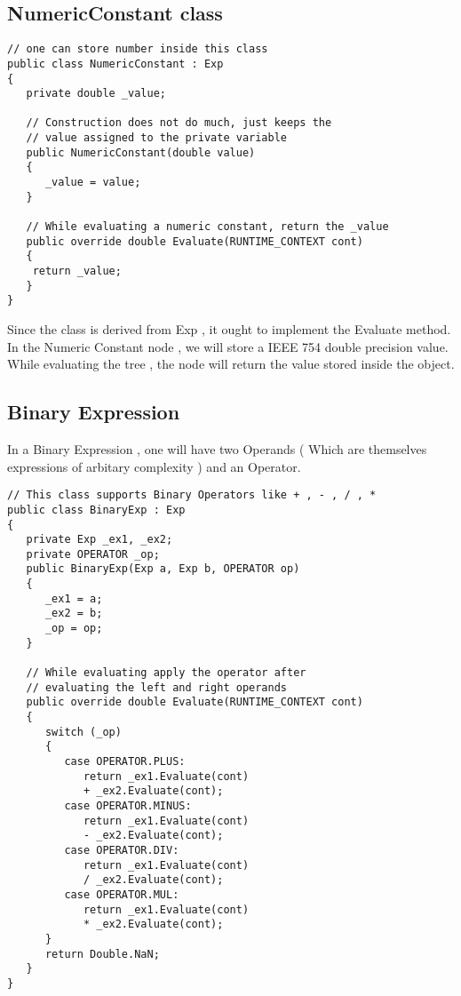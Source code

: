 \subsection{NumericConstant class}
\lstset{style=csharp}
\begin{lstlisting}
// one can store number inside this class
public class NumericConstant : Exp
{
   private double _value;
   
   // Construction does not do much, just keeps the
   // value assigned to the private variable
   public NumericConstant(double value)
   {
      _value = value;
   }
   
   // While evaluating a numeric constant, return the _value
   public override double Evaluate(RUNTIME_CONTEXT cont)
   {
    return _value;
   }
}
\end{lstlisting}
Since the class is derived from Exp , it ought to implement the Evaluate method. In the Numeric Constant node , we will store a IEEE 754 double precision value. While evaluating the tree , the node will return the value stored inside the object.
\clearpage
\subsection{Binary Expression}
In a Binary Expression , one will have two Operands ( Which are themselves expressions of arbitary complexity ) and an Operator.
\lstset{style=csharp}
\begin{lstlisting}
// This class supports Binary Operators like + , - , / , *
public class BinaryExp : Exp
{
   private Exp _ex1, _ex2;
   private OPERATOR _op;
   public BinaryExp(Exp a, Exp b, OPERATOR op)
   {
      _ex1 = a;
      _ex2 = b;
      _op = op;
   }

   // While evaluating apply the operator after 
   // evaluating the left and right operands
   public override double Evaluate(RUNTIME_CONTEXT cont)
   {
      switch (_op)
      {
         case OPERATOR.PLUS:
            return _ex1.Evaluate(cont) 
            + _ex2.Evaluate(cont);
         case OPERATOR.MINUS:
            return _ex1.Evaluate(cont) 
            - _ex2.Evaluate(cont);
         case OPERATOR.DIV:
            return _ex1.Evaluate(cont) 
            / _ex2.Evaluate(cont);
         case OPERATOR.MUL:
            return _ex1.Evaluate(cont) 
            * _ex2.Evaluate(cont);
      }
      return Double.NaN;
   }
}
\end{lstlisting}
\clearpage 
